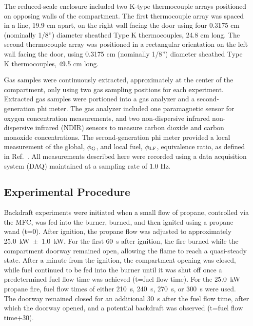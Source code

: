 \documentclass[12pt,letterpaper]{article}
\begin{document}
\begin{flushleft}
The reduced-scale enclosure included two K-type thermocouple arrays positioned on opposing walls of the compartment. The first thermocouple array was spaced in a line, 19.9 cm apart, on the right wall facing the door using four 0.3175 cm (nominally 1/8”) diameter sheathed Type K thermocouples, 24.8 cm long. The second thermocouple array was positioned in a rectangular orientation on the left wall facing the door, using 0.3175 cm (nominally 1/8”) diameter sheathed Type K thermocouples, 49.5 cm long. 

Gas samples were continuously extracted, approximately at the center of the compartment, only using two gas sampling positions for each experiment. Extracted gas samples were portioned into a gas analyzer and a second-generation phi meter. The gas analyzer included one paramagnetic sensor for oxygen concentration measurements, and two non-dispersive infrared non-dispersive infrared (NDIR) sensors to measure carbon dioxide and carbon monoxide concentrations. The second-generation phi meter provided a local measurement of the global, $\phi_{\rm{G}}$, and local fuel, $\phi_{\rm{LF}}$, equivalence ratio, as defined in Ref.~\cite{falkenstein2023equivalence}. All measurements described here were recorded using a data acquisition system (DAQ) maintained at a sampling rate of 1.0 Hz. 

\subsection{Experimental Procedure} \addvspace{10pt}
\label{sec:procedure}
Backdraft experiments were initiated when a small flow of propane, controlled via the MFC,  was fed into the burner, burned, and then ignited using a propane wand (t=0). After ignition, the propane flow was adjusted to approximately 25.0~kW~$\pm$~1.0~kW. For the first 60~s after ignition, the fire burned while the compartment doorway remained open, allowing the flame to reach a quasi-steady state. After a minute from the ignition, the compartment opening was closed, while fuel continued to be fed into the burner until it was shut off once a predetermined fuel flow time was achieved (t=fuel flow time). For the 25.0~kW propane fire, fuel flow times of either 210~s, 240~s, 270~s, or 300~s were used. The doorway remained closed for an additional 30~s after the fuel flow time, after which the doorway opened, and a potential backdraft was observed (t=fuel flow time+30).


\end{flushleft}
\end{document}
